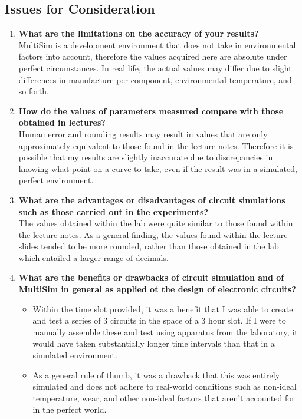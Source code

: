 \documentclass[12pt]{article}
\begin{document}
\subsection{Issues for Consideration}
\begin{enumerate}
  \item \textbf{What are the limitations on the accuracy of your results?} \hfill \\
  MultiSim is a development environment that does not take in environmental factors into account, therefore the values acquired here are absolute under perfect circumstances. In real life, the actual values may differ due to slight differences in manufacture per component, environmental temperature, and so forth.
  \item \textbf{How do the values of parameters measured compare with those obtained in lectures?} \hfill \\
  Human error and rounding results may result in values that are only approximately equivalent to those found in the lecture notes. Therefore it is possible that my results are slightly inaccurate due to discrepancies in knowing what point on a curve to take, even if the result was in a simulated, perfect environment.
  \item \textbf{What are the advantages or disadvantages of circuit simulations such as those carried out in the experiments?} \hfill \\
  The values obtained within the lab were quite similar to those found within the lecture notes. As a general finding, the values found within the lecture slides tended to be more rounded, rather than those obtained in the lab which entailed a larger range of decimals.
  \item \textbf{What are the benefits or drawbacks of circuit simulation and of MultiSim in general as applied ot the design of electronic circuits?} \hfill
  \begin{itemize}
  \item Within the time slot provided, it was a benefit that I was able to create and test a series of 3 circuits in the space of a 3 hour slot. If I were to manually assemble these and test using apparatus from the laboratory, it would have taken substantially longer time intervals than that in a simulated environment.
  \item As a general rule of thumb, it was a drawback that this was entirely simulated and does not adhere to real-world conditions such as non-ideal temperature, wear, and other non-ideal factors that aren't accounted for in the perfect world.

\end{itemize}
\end{enumerate}
\end{document}
